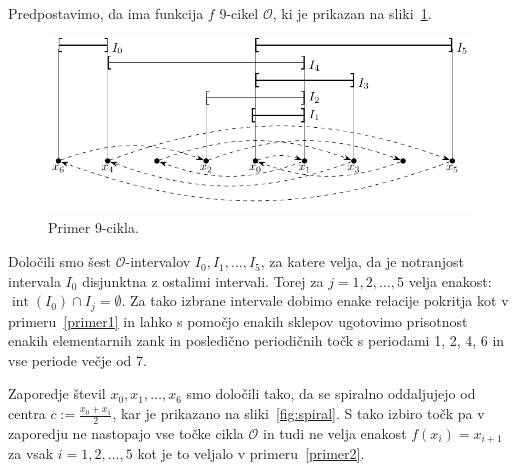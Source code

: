 \documentclass[mat2]{fmfdelo}
\DeclareMathOperator{\interior}{int}
\begin{document}
\begin{primer}[9-cikel] \label{primer3}
Predpostavimo, da ima funkcija $f$ 9-cikel $\mathcal{O}$, ki je prikazan na sliki~\ref{fig:9cikel}. 
\begin{figure}[h]
  \centering
  \includegraphics{images/devetcikel.pdf}
  \caption[Primer vektorske slike.]{Primer 9-cikla.}
  \label{fig:9cikel}
\end{figure}
Določili smo šest $\mathcal{O}$-intervalov $I_0, I_1, \dots, I_5$, za katere velja, da je notranjost intervala $I_0$ disjunktna z ostalimi intervali. Torej za $j=1, 2, \dots, 5$ velja enakost: $\interior{(I_0)} \cap I_j = \emptyset$. Za tako izbrane intervale dobimo enake relacije pokritja kot v primeru~\ref{primer1} in lahko s pomočjo enakih sklepov ugotovimo prisotnost enakih elementarnih zank in posledično periodičnih točk s periodami 1, 2, 4, 6 in vse periode večje od 7.

Zaporedje števil $x_0, x_1, \dots, x_6$ smo določili tako, da se spiralno oddaljujejo od centra $c:=\frac{x_0+x_1}{2}$, kar je prikazano na sliki~\ref{fig:spiral}. S tako izbiro točk pa v zaporedju ne nastopajo vse točke cikla $\mathcal{O}$ in tudi ne velja enakost $f(x_i) = x_{i+1}$ za vsak $i = 1, 2, \dots, 5$ kot je to veljalo v primeru~\ref{primer2}.


\end{primer}
\end{document}
